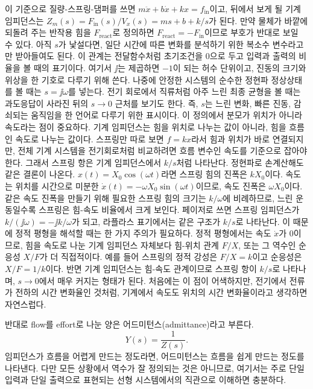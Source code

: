 이 기준으로 질량-스프링-댐퍼를 쓰면 $m\ddot{x}+b\dot{x}+kx=f_{\mathrm{in}}$이고, 뒤에서 보게 될 기계 임피던스는 $Z_m(s)=F_{\mathrm{in}}(s)/V_x(s)=ms+b+k/s$가 된다.
만약 물체가 바깥에 되돌려 주는 반작용 힘을 $F_{\mathrm{react}}$로 정의하면 $F_{\mathrm{react}}=-F_{\mathrm{in}}$이므로 부호가 반대로 보일 수 있다.
아직 $s$가 낯설다면, 일단 시간에 따른 변화를 분석하기 위한 복소수 변수라고만 받아들여도 된다.
이 관계는 전달함수처럼 초기조건을 0으로 두고 입력과 출력의 비율을 볼 때의 표기이다.
여기서 $\jj$는 제곱하면 $-1$이 되는 허수 단위이고, 진동의 크기와 위상을 한 기호로 다루기 위해 쓴다.
%
나중에 안정한 시스템의 순수한 정현파 정상상태를 볼 때는 $s=\jj\omega$를 넣는다.
전기 회로에서 직류처럼 아주 느린 최종 균형을 볼 때는 과도응답이 사라진 뒤의 $s\to 0$ 근처를 보기도 한다.
즉, $s$는 느린 변화, 빠른 진동, 감쇠되는 움직임을 한 언어로 다루기 위한 표시이다.
이 정의에서 분모가 위치가 아니라 속도라는 점이 중요하다.
기계 임피던스는 힘을 위치로 나누는 값이 아니라, 힘을 흐름인 속도로 나누는 값이다.
스프링만 따로 보면 $f=kx$라서 힘과 위치가 바로 연결되지만, 전체 기계 시스템을 전기회로처럼 비교하려면 흐름 변수인 속도를 기준으로 잡아야 한다.
그래서 스프링 항은 기계 임피던스에서 $k/s$처럼 나타난다.
정현파로 손계산해도 같은 결론이 나온다.
$x(t)=X_0\cos(\omega t)$라면 스프링 힘의 진폭은 $kX_0$이다.
속도는 위치를 시간으로 미분한 $\dot{x}(t)=-\omega X_0\sin(\omega t)$이므로, 속도 진폭은 $\omega X_0$이다.
%
같은 속도 진폭을 만들기 위해 필요한 스프링 힘의 크기는 $k/\omega$에 비례하므로, 느린 운동일수록 스프링은 힘-속도 비율에서 크게 보인다.
페이저로 쓰면 스프링 임피던스가 $k/(\jj\omega)=-\jj k/\omega$가 되고, 라플라스 표기에서는 같은 구조가 $k/s$로 나타난다.
이 때문에 정적 평형을 해석할 때는 한 가지 주의가 필요하다.
정적 평형에서는 속도 $\dot{x}$가 0이므로, 힘을 속도로 나눈 기계 임피던스 자체보다 힘-위치 관계 $F/X$, 또는 그 역수인 순응성 $X/F$가 더 직접적이다.
예를 들어 스프링의 정적 강성은 $F/X=k$이고 순응성은 $X/F=1/k$이다.
반면 기계 임피던스는 힘-속도 관계이므로 스프링 항이 $k/s$로 나타나며, $s\to0$에서 매우 커지는 형태가 된다.
처음에는 이 점이 어색하지만, 전기에서 전류가 전하의 시간 변화율인 것처럼, 기계에서 속도도 위치의 시간 변화율이라고 생각하면 자연스럽다.

반대로 flow를 effort로 나눈 양은 어드미턴스(admittance)라고 부른다.
\begin{equation}
  Y(s) = \frac{1}{Z(s)}.
\end{equation}
임피던스가 흐름을 어렵게 만드는 정도라면, 어드미턴스는 흐름을 쉽게 만드는 정도를 나타낸다.
다만 모든 상황에서 역수가 잘 정의되는 것은 아니므로, 여기서는 주로 단일 입력과 단일 출력으로 표현되는 선형 시스템에서의 직관으로 이해하면 충분하다.

